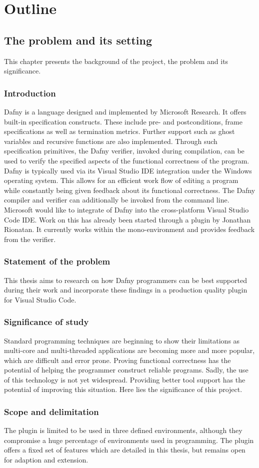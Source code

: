 \section{Outline}
\subsection{The problem and its setting}
This chapter presents the background of the project, the problem and its significance.
\subsubsection{Introduction}
Dafny is a language designed and implemented by Microsoft Research. It offers built-in specification constructs. These include pre- and postconditions, frame specifications as well as termination metrics. Further support such as ghost variables and recursive functions are also implemented. Through such specification primitives, the Dafny verifier, invoked during compilation, can be used to verify the specified aspects of the functional correctness of the program. \newline
Dafny is typically used via its Visual Studio IDE integration under the Windows operating system. This allows for an efficient work flow of editing a program while constantly being given feedback about its functional correctness. The Dafny compiler and verifier can additionally be invoked from the command line. \newline
Microsoft would like to integrate of Dafny into the cross-platform Visual Studio Code IDE. Work on this has already been started through a plugin by Jonathan Rionatan. It currently works within the mono-environment and provides feedback from the verifier. 
\subsubsection{Statement of the problem}
This thesis aims to research on how Dafny programmers can be best supported during their work and incorporate these findings in a production quality plugin for Visual Studio Code. 
\subsubsection{Significance of study}
Standard programming techniques are beginning to show their limitations as multi-core and multi-threaded applications are becoming more and more popular, which are difficult and error prone.
Proving functional correctness has the potential of helping the programmer construct reliable programs.
Sadly, the use of this technology is not yet widespread. Providing better tool support has the potential of improving this situation. Here lies the significance of this project.
\subsubsection{Scope and delimitation}
The plugin is limited to be used in three defined environments, although they compromise a huge percentage of environments used in programming. The plugin offers a fixed set of features which are detailed in this thesis, but remains open for adaption and extension.